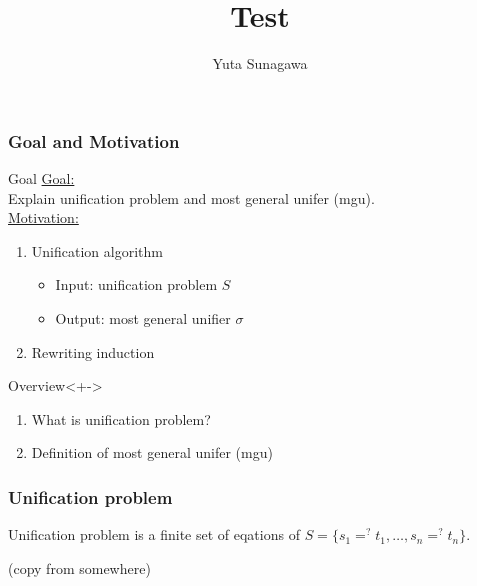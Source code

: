 \documentclass[aspectratio=169,12pt]{beamer}
\author{Yuta Sunagawa}
\begin{document}
  \title{Test} %
  \begin{frame}
    \maketitle
    \begin{quote}
    \end{quote}
  \end{frame}

  \begin{frame}
    \frametitle{Goal and Motivation}
    \begin{alertblock}{Goal}
      {\underline{Goal:}}\\
      Explain unification problem and most general unifer (mgu).\\
      {\underline{Motivation:}}\\
        \begin{enumerate}
            \item Unification algorithm
          \begin{itemize}
            \item Input: unification problem $S$
            \item Output: most general unifier $\sigma$
          \end{itemize}
          \item Rewriting induction
        \end{enumerate}
    \end{alertblock}
    \begin{block}{Overview}<+->
      \begin{enumerate}
        \item What is unification problem? 
        \item Definition of most general unifer (mgu)
      \end{enumerate}
    \end{block}
  \end{frame}

  \begin{frame}
    \frametitle{Unification problem}
    \begin{definition}
      \alert{Unification problem} is a finite set of eqations of $S = \{s_1 =^? t_1, \ldots, s_n =^? t_n\}$.
    \end{definition}
    \begin{example}
      (copy from somewhere)
    \end{example}
  \end{frame}
\end{document}
